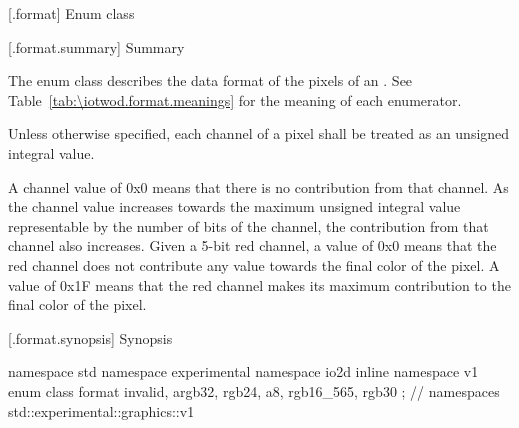  [\iotwod.format] {Enum class }

 [\iotwod.format.summary] { Summary}

\pnum
The  enum class describes the data format of the pixels of an 
. See Table~\ref{tab:\iotwod.format.meanings} for 
the meaning of each  enumerator.

\pnum
Unless otherwise specified, each channel of a pixel shall be treated as an 
unsigned integral value.

\pnum
A channel value of 0x0 means that there is no contribution from that channel. 
As the channel value increases towards the maximum unsigned integral value 
representable by the number of bits of the channel, the contribution from that 
channel also increases.
\enterexample
Given a 5-bit red channel, a value of 0x0 means that the red channel does not 
contribute any value towards the final color of the pixel. A value of 0x1F 
means that the red channel makes its maximum contribution to the final color of 
the pixel.
\exitexample

 [\iotwod.format.synopsis] { Synopsis}

\begin{codeblock}
namespace std { namespace experimental { namespace io2d { inline namespace v1 {
  enum class format {
    invalid,
    argb32,
    rgb24,
    a8,
    rgb16_565,
    rgb30
  };
} } } } // namespaces std::experimental::graphics::v1
\end{codeblock}

